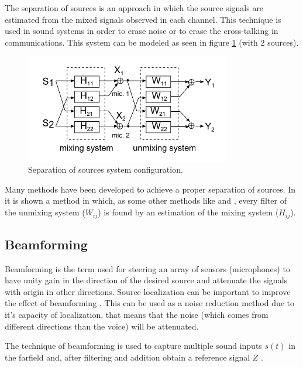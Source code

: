 The separation of sources is an approach in which the source signals are estimated from the mixed signals observed in each channel. This technique is used in sound systems in order to erase noise or to erase the cross-talking in communications. This system can be modeled as seen in figure \ref{fig:sepa} (with 2 sources).


\begin{figure}[!ht]
  \center
	\includegraphics[width=90mm]{State_of_Art/sepa}
	\caption{Separation of sources system configuration.}
	\label{fig:sepa}
\end{figure}

Many methods have been developed to achieve a proper separation of sources. In \cite{Smaragdis1998BlindDomain} it is shown a method in which, as some other methods like \cite{Bourgeois2004Frequency-domainCorrelation} and \cite{Mei2006BlindCriterion}, every filter of the unmixing system ($W_{ij}$) is found by an estimation of the mixing system ($H_{ij}$). 



\subsection{Beamforming}

Beamforming is the term used for steering an array of sensors (microphones) to have unity gain in the direction of the desired source and attenuate the signals with origin in other directions. Source localization can be important to improve the effect of beamforming \cite{Faneuff2002SpatialCar}. This can be used as a noise reduction method due to it's capacity of localization, that means that the noise (which comes from different directions than the voice) will be attenuated. 


The technique of beamforming is used to capture multiple sound inputs $s(t)$ in the farfield and, after filtering and addition obtain a reference signal $Z$ \cite{Faneuff2002SpatialCar}. 





